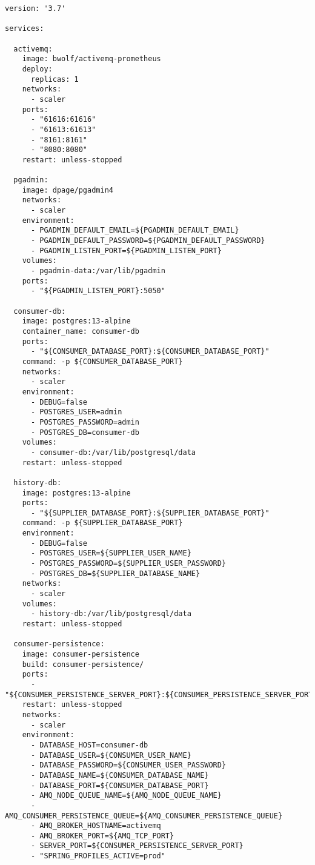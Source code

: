 \begin{lstlisting}[style=bashStyle,caption={Docker Compose},label=lst:dockerCompose]
version: '3.7'

services:

  activemq:
    image: bwolf/activemq-prometheus
    deploy:
      replicas: 1
    networks:
      - scaler
    ports:
      - "61616:61616"
      - "61613:61613"
      - "8161:8161"
      - "8080:8080"
    restart: unless-stopped

  pgadmin:
    image: dpage/pgadmin4
    networks:
      - scaler
    environment:
      - PGADMIN_DEFAULT_EMAIL=${PGADMIN_DEFAULT_EMAIL}
      - PGADMIN_DEFAULT_PASSWORD=${PGADMIN_DEFAULT_PASSWORD}
      - PGADMIN_LISTEN_PORT=${PGADMIN_LISTEN_PORT}
    volumes:
      - pgadmin-data:/var/lib/pgadmin
    ports:
      - "${PGADMIN_LISTEN_PORT}:5050"

  consumer-db:
    image: postgres:13-alpine
    container_name: consumer-db
    ports:
      - "${CONSUMER_DATABASE_PORT}:${CONSUMER_DATABASE_PORT}"
    command: -p ${CONSUMER_DATABASE_PORT}
    networks:
      - scaler
    environment:
      - DEBUG=false
      - POSTGRES_USER=admin
      - POSTGRES_PASSWORD=admin
      - POSTGRES_DB=consumer-db
    volumes:
      - consumer-db:/var/lib/postgresql/data
    restart: unless-stopped

  history-db:
    image: postgres:13-alpine
    ports:
      - "${SUPPLIER_DATABASE_PORT}:${SUPPLIER_DATABASE_PORT}"
    command: -p ${SUPPLIER_DATABASE_PORT}
    environment:
      - DEBUG=false
      - POSTGRES_USER=${SUPPLIER_USER_NAME}
      - POSTGRES_PASSWORD=${SUPPLIER_USER_PASSWORD}
      - POSTGRES_DB=${SUPPLIER_DATABASE_NAME}
    networks:
      - scaler
    volumes:
      - history-db:/var/lib/postgresql/data
    restart: unless-stopped

  consumer-persistence:
    image: consumer-persistence
    build: consumer-persistence/
    ports:
      - "${CONSUMER_PERSISTENCE_SERVER_PORT}:${CONSUMER_PERSISTENCE_SERVER_PORT}"
    restart: unless-stopped
    networks:
      - scaler
    environment:
      - DATABASE_HOST=consumer-db
      - DATABASE_USER=${CONSUMER_USER_NAME}
      - DATABASE_PASSWORD=${CONSUMER_USER_PASSWORD}
      - DATABASE_NAME=${CONSUMER_DATABASE_NAME}
      - DATABASE_PORT=${CONSUMER_DATABASE_PORT}
      - AMQ_NODE_QUEUE_NAME=${AMQ_NODE_QUEUE_NAME}
      - AMQ_CONSUMER_PERSISTENCE_QUEUE=${AMQ_CONSUMER_PERSISTENCE_QUEUE}
      - AMQ_BROKER_HOSTNAME=activemq
      - AMQ_BROKER_PORT=${AMQ_TCP_PORT}
      - SERVER_PORT=${CONSUMER_PERSISTENCE_SERVER_PORT}
      - "SPRING_PROFILES_ACTIVE=prod"


\end{lstlisting}
